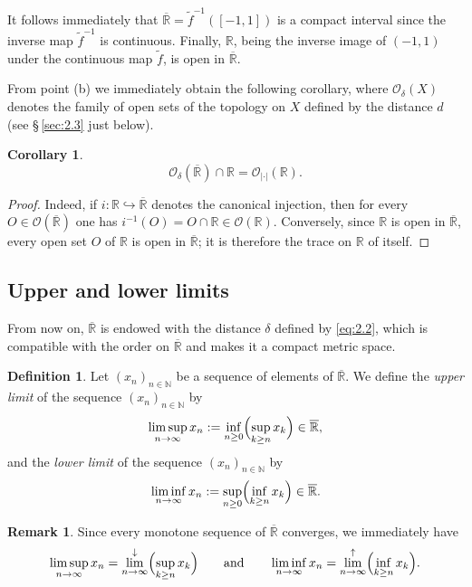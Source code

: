 \documentclass[11pt]{article}
\newtheorem{corollary}{Corollary}[section]
\theoremstyle{definition}
\newtheorem{definition}{Definition}[section]
\newtheorem{remark}{Remark}[section]
\begin{document}
It follows immediately that $\overline{\mathbb{R}}=\tilde f^{-1}([-1,1])$ is a compact interval since the inverse map $\tilde f^{-1}$ is continuous.
Finally, $\mathbb{R}$, being the inverse image of $(-1,1)$ under the continuous map $\tilde f$, is open in $\overline{\mathbb{R}}$.

From point (b) we immediately obtain the following corollary, where $\mathcal{O}_\delta(X)$ denotes the family of open sets of the topology on $X$ defined by the distance $d$ (see \S\,\ref{sec:2.3} just below).

\begin{corollary}
\[
\mathcal{O}_\delta(\overline{\mathbb{R}})\cap \mathbb{R}=\mathcal{O}_{|\cdot|}(\mathbb{R}).
\]
\end{corollary}

\begin{proof}
Indeed, if $i:\mathbb{R}\hookrightarrow \overline{\mathbb{R}}$ denotes the canonical injection, then for every $O\in\mathcal{O}(\overline{\mathbb{R}})$ one has $i^{-1}(O)=O\cap\mathbb{R}\in\mathcal{O}(\mathbb{R})$.
Conversely, since $\mathbb{R}$ is open in $\overline{\mathbb{R}}$, every open set $O$ of $\mathbb{R}$ is open in $\overline{\mathbb{R}}$; it is therefore the trace on $\mathbb{R}$ of itself.
\end{proof}

\subsection{Upper and lower limits}

From now on, $\overline{\mathbb{R}}$ is endowed with the distance $\delta$ defined by \eqref{eq:2.2}, which is compatible with the order on $\overline{\mathbb{R}}$ and makes it a compact metric space.

\begin{definition}
Let $(x_n)_{n\in\mathbb{N}}$ be a sequence of elements of $\overline{\mathbb{R}}$.
We define the \emph{upper limit} of the sequence $(x_n)_{n\in\mathbb{N}}$ by
\[
\limsup_{n\to\infty} x_n:=\inf_{n\ge 0}\Bigl(\sup_{k\ge n} x_k\Bigr)\in\overline{\mathbb{R}},
\]
and the \emph{lower limit} of the sequence $(x_n)_{n\in\mathbb{N}}$ by
\[
\liminf_{n\to\infty} x_n:=\sup_{n\ge 0}\Bigl(\inf_{k\ge n} x_k\Bigr)\in\overline{\mathbb{R}}.
\]
\end{definition}

\begin{remark}
Since every monotone sequence of $\overline{\mathbb{R}}$ converges, we immediately have
\[
\limsup_{n\to\infty} x_n=\lim_{n\to\infty}^{\downarrow}\Bigl(\sup_{k\ge n} x_k\Bigr)
\qquad\text{and}\qquad
\liminf_{n\to\infty} x_n=\lim_{n\to\infty}^{\uparrow}\Bigl(\inf_{k\ge n} x_k\Bigr).
\]
\end{remark}
\end{document}
